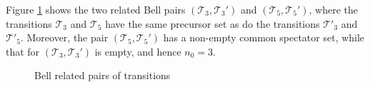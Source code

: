 \documentclass[11pt]{article}
\newcommand{\cT}{\mathcal T}
\newcommand*{\drawprobarrow}[4][]{%
  \draw[prob arrow] (#2)-- node[sloped,midway, below, #1] {$#3$} (#4);
}
\begin{document}
Figure \ref{bellpair.fig}   shows the two related Bell pairs
$(\cT_3,\cT_3')$ and $ (\cT_5,\cT_5')$, where the transitions
$\cT_3$ and $\cT_5$  have the same precursor
  set  as do the transitions 
  $\cT'_3$ and $\cT'_5$. Moreover, the pair $(\cT_5,\cT_5')$ has  a 
 non-empty  common spectator set, while that for  $(\cT_3,\cT_3')$ is
 empty, and hence $n_0=3$.  
\begin{figure} 
\begin{center}
\caption{Bell related pairs of transitions}
\label{bellpair.fig}
\end{center}
\end{figure} 
\end{document}
